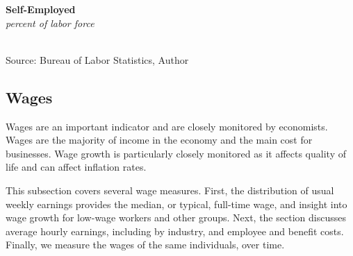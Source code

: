 \documentclass{report}
\makeatletter
\newcommand{\tbllink}[1]{\href{https://raw.githubusercontent.com/bdecon/US-chartbook/master/chartbook/data/#1}{\faTable}}
\newcommand*\short[1]{\expandafter\@gobbletwo\number\numexpr#1\relax}
\newcommand{\absnode}[3]{\node[below right, align=left] at (axis cs: #1,#2) {#3};}
\newcommand{\shdateaxisticks}{
		date coordinates in=x, axis line style={draw=none},
		xmax={2023-10-01},
		max space between ticks=40,	    
		xtick={{1990-01-01}, {1995-01-01}, {2000-01-01}, 
			{2005-01-01}, {2010-01-01}, {2015-01-01}, {2020-01-01}},
		minor xtick={},
		enlarge y limits={0.06}, enlarge x limits={0.01},
		}
\newcommand{\bbar}[2]{extra #1 ticks = {{#2}}, extra #1 tick labels = ,
		extra #1 tick style = {grid=major, grid style={thick, black!25}},}
\newcommand{\stdline}[4]{\addplot[very thick, no markers, color=#1] 
		table [x=#2, y=#3, col sep=comma] {#4};	}
\newcommand{\rbars}{
		\fill[color=black!10] (axis cs:{1990-07-01},\pgfkeysvalueof{/pgfplots/ymin}) rectangle 
			(axis cs:{1991-03-01}, \pgfkeysvalueof{/pgfplots/ymax});
		\fill[color=black!10] (axis cs:{2007-12-01},\pgfkeysvalueof{/pgfplots/ymin}) rectangle 
			(axis cs:{2009-07-01}, \pgfkeysvalueof{/pgfplots/ymax});
		\fill[color=black!10] (axis cs:{2001-03-01},\pgfkeysvalueof{/pgfplots/ymin}) rectangle 
			(axis cs:{2001-11-01}, \pgfkeysvalueof{/pgfplots/ymax});
		\fill[color=black!10] (axis cs:{2020-02-01},\pgfkeysvalueof{/pgfplots/ymin}) rectangle 
			(axis cs:{2020-05-01}, \pgfkeysvalueof{/pgfplots/ymax});}
\makeatother
\begin{document}
{\begin{minipage}{0.76\textwidth}

\vspace{0.5mm}

\begin{minipage}{0.56\textwidth}
\normalsize \textbf{Self-Employed}\\
\footnotesize{\textit{percent of labor force}}\\
\hspace*{-2mm} \\
\footnotesize{Source: Bureau of Labor Statistics, Author} \hfill \tbllink{selfemp.csv} 
\end{minipage} \hfill
\begin{minipage}{0.38\textwidth}
\small 
\end{minipage}
\end{minipage}
\newpage
\vspace{-9mm}

\begin{minipage}{0.76\textwidth}   
\subsection*{Wages} \hypertarget{labw}{\label{labw}}
\small Wages are an important indicator and are closely monitored by economists. Wages are the majority of income in the economy and the main cost for businesses. Wage growth is particularly closely monitored as it affects quality of life and can affect inflation rates. 

This subsection covers several wage measures. First, the distribution of usual weekly earnings provides the median, or typical, full-time wage, and insight into wage growth for low-wage workers and other groups. Next, the section discusses average hourly earnings, including by industry, and employee and benefit costs. Finally, we measure the wages of the same individuals, over time. 


\end{minipage}}
\end{document}
